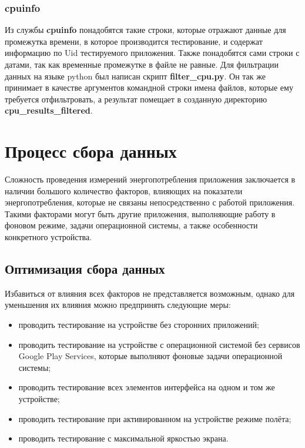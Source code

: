 \documentclass[a4paper,14pt]{extarticle} %
\begin{document}
	\subsubsection{cpuinfo}
	
	Из службы \textbf{cpuinfo} понадобятся такие строки, которые отражают данные для промежутка времени, в которое производится тестирование, и содержат информацию по Uid тестируемого приложения. Также понадобятся сами строки с датами, так как временные промежутке в файле не равные. Для фильтрации данных на языке python был написан скрипт \textbf{filter\_cpu.py}. Он так же принимает в качестве аргументов командной строки имена файлов, которые ему требуется отфильтровать, а результат помещает в созданную директорию \textbf{cpu\_results\_filtered}.

	\newpage
	\section{Процесс сбора данных}
	
	Сложность проведения измерений энергопотребления приложения заключается в наличии большого количество факторов, влияющих на показатели энергопотребления, которые не связаны непосредственно с работой приложения. Такими факторами могут быть другие приложения, выполняющие работу в фоновом режиме, задачи операционной системы, а также особенности конкретного устройства.
	
	\subsection{Оптимизация сбора данных} \label{sub:optimization}
	
	 Избавиться от влияния всех факторов не представляется возможным, однако для уменьшения их влияния можно предпринять следующие меры:
	\begin{itemize}
		\item проводить тестирование на устройстве без сторонних приложений;
		\item проводить тестирование на устройстве с операционной системой без сервисов Google Play Services, которые выполняют фоновые задачи операционной системы;
		\item проводить тестирование всех элементов интерфейса на одном и том же устройстве;
		\item проводить тестирование при активированном на устройстве режиме полёта;
		\item проводить тестирование с максимальной яркостью экрана.
	\end{itemize}
\end{document}
